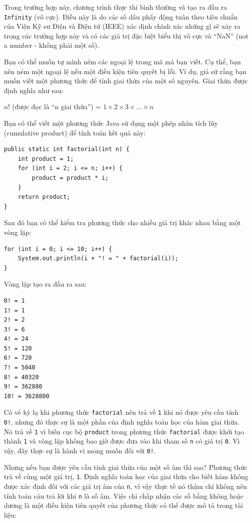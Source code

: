 Trong trường hợp này, chương trình thực thi bình thường và tạo ra đầu ra
\texttt{Infinity} (vô cực). Điều này là do các số dấu phẩy động tuân
theo tiêu chuẩn của Viện Kỹ sư Điện và Điện tử (IEEE) xác định chính xác
những gì sẽ xảy ra trong các trường hợp này và có các giá trị đặc biệt
biểu thị vô cực và ``NaN'' (not a number - không phải một số).

Bạn có thể muốn tự mình ném các ngoại lệ trong mã mà bạn viết. Cụ thể,
bạn nên ném một ngoại lệ nếu một điều kiện tiên quyết bị lỗi. Ví dụ, giả
sử rằng bạn muốn viết một phương thức để tính giai thừa của một số
nguyên. Giai thừa được định nghĩa như sau:

\(n!\) (được đọc là ``n giai thừa'') =
\(1 \times 2 \times 3 \times ... \times n\)

Bạn có thể viết một phương thức Java sử dụng một phép nhân tích lũy
(cumulative product) để tính toán kết quả này:

\begin{verbatim}
public static int factorial(int n) {
    int product = 1;
    for (int i = 2; i <= n; i++) {
        product = product * i;
    }
    return product;
}
\end{verbatim}

Sau đó bạn có thể kiểm tra phương thức cho nhiều giá trị khác nhau bằng
một vòng lặp:

\begin{verbatim}
for (int i = 0; i <= 10; i++) {
    System.out.println(i + "! = " + factorial(i));
}
\end{verbatim}

Vòng lặp tạo ra đầu ra sau:

\begin{verbatim}
0! = 1 
1! = 1 
2! = 2 
3! = 6 
4! = 24 
5! = 120 
6! = 720 
7! = 5040 
8! = 40320 
9! = 362880 
10! = 3628800
\end{verbatim}

Có vẻ kỳ lạ khi phương thức \texttt{factorial} nên trả về \texttt{1} khi
nó được yêu cầu tính \texttt{0!}, nhưng đó thực sự là một phần của định
nghĩa toán học của hàm giai thừa. Nó trả về \texttt{1} vì biến cục bộ
\texttt{product} trong phương thức \texttt{factorial} được khởi tạo
thành \texttt{1} và vòng lặp không bao giờ được đưa vào khi tham số
\texttt{n} có giá trị \texttt{0}. Vì vậy, đây thực sự là hành vi mong
muốn đối với \texttt{0!}.

Nhưng nếu bạn được yêu cầu tính giai thừa của một số âm thì sao? Phương
thức trả về cùng một giá trị, \texttt{1}. Định nghĩa toán học của giai
thừa cho biết hàm không được xác định đối với các giá trị âm của
\texttt{n}, vì vậy thực tế nó thậm chí không nên tính toán câu trả lời
khi \texttt{n} là số âm. Việc chỉ chấp nhận các số bằng không hoặc dương
là một điều kiện tiên quyết của phương thức có thể được mô tả trong tài
liệu:

